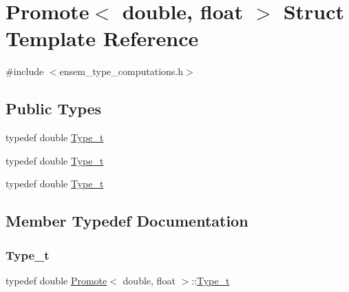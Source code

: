\hypertarget{structPromote_3_01double_00_01float_01_4}{}\section{Promote$<$ double, float $>$ Struct Template Reference}
\label{structPromote_3_01double_00_01float_01_4}


{\ttfamily \#include $<$ensem\+\_\+type\+\_\+computations.\+h$>$}

\subsection*{Public Types}
\begin{DoxyCompactItemize}
\item 
typedef double \mbox{\hyperlink{structPromote_3_01double_00_01float_01_4_a13a1db5ec3dbe8a0dbe04bfa1602202c}{Type\+\_\+t}}
\item 
typedef double \mbox{\hyperlink{structPromote_3_01double_00_01float_01_4_a13a1db5ec3dbe8a0dbe04bfa1602202c}{Type\+\_\+t}}
\item 
typedef double \mbox{\hyperlink{structPromote_3_01double_00_01float_01_4_a13a1db5ec3dbe8a0dbe04bfa1602202c}{Type\+\_\+t}}
\end{DoxyCompactItemize}


\subsection{Member Typedef Documentation}
\mbox{\label{structPromote_3_01double_00_01float_01_4_a13a1db5ec3dbe8a0dbe04bfa1602202c}} 
\subsubsection{\texorpdfstring{Type\_t}{Type\_t}\hspace{0.1cm}{\footnotesize\ttfamily [1/3]}}
{\footnotesize\ttfamily typedef double \mbox{\hyperlink{structPromote}{Promote}}$<$ double, float $>$\+::\mbox{\hyperlink{structPromote_3_01double_00_01float_01_4_a13a1db5ec3dbe8a0dbe04bfa1602202c}{Type\+\_\+t}}}

\mbox{\label{structPromote_3_01double_00_01float_01_4_a13a1db5ec3dbe8a0dbe04bfa1602202c}} 
